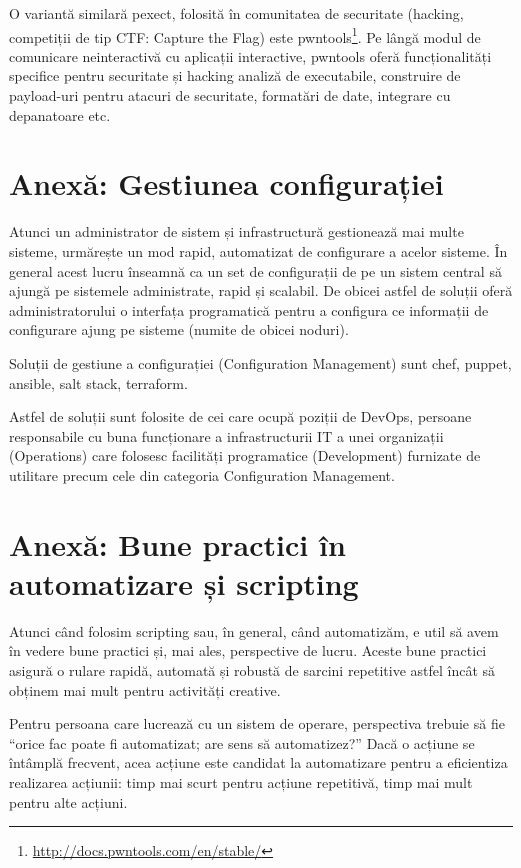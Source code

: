 O variantă similară pexect, folosită în comunitatea de securitate (hacking,
competiții de tip CTF: Capture the Flag) este
pwntools\footnote{\url{http://docs.pwntools.com/en/stable/}}. Pe lângă modul de
comunicare neinteractivă cu aplicații interactive, pwntools oferă
funcționalități specifice pentru securitate și hacking analiză de executabile,
construire de payload-uri pentru atacuri de securitate, formatări de date,
integrare cu depanatoare etc.

\section{Anexă: Gestiunea configurației}
\label{sec:script-conf}

Atunci un administrator de sistem și infrastructură gestionează mai multe
sisteme, urmărește un mod rapid, automatizat de configurare a acelor sisteme. În
general acest lucru înseamnă ca un set de configurații de pe un sistem central
să ajungă pe sistemele administrate, rapid și scalabil. De obicei astfel de
soluții oferă administratorului o interfața programatică pentru a configura ce
informații de configurare ajung pe sisteme (numite de obicei noduri).

Soluții de gestiune a configurației (Configuration Management) sunt chef,
puppet, ansible, salt stack, terraform.

Astfel de soluții sunt folosite de cei care ocupă poziții de DevOps, persoane
responsabile cu buna funcționare a infrastructurii IT a unei organizații
(Operations) care folosesc facilități programatice (Development) furnizate de
utilitare precum cele din categoria Configuration Management.

\section{Anexă: Bune practici în automatizare și scripting}
\label{sec:script-good}

Atunci când folosim scripting sau, în general, când automatizăm, e util să avem
în vedere bune practici și, mai ales, perspective de lucru. Aceste bune practici
asigură o rulare rapidă, automată și robustă de sarcini repetitive astfel încât
să obținem mai mult pentru activități creative.

Pentru persoana care lucrează cu un sistem de operare, perspectiva trebuie să
fie “orice fac poate fi automatizat; are sens să automatizez?” Dacă o acțiune se
întâmplă frecvent, acea acțiune este candidat la automatizare pentru a
eficientiza realizarea acțiunii: timp mai scurt pentru acțiune repetitivă, timp
mai mult pentru alte acțiuni.

